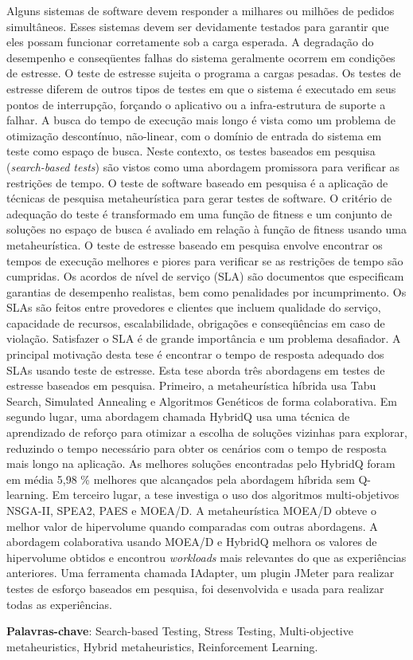 
\begin{resumo} 
 
Alguns sistemas de software devem responder a milhares ou milhões de pedidos simultâneos.
Esses sistemas devem ser devidamente testados para garantir que eles possam funcionar corretamente sob a carga esperada. A degradação do desempenho e conseqüentes falhas do sistema geralmente ocorrem em condições de estresse. O teste de estresse sujeita o programa a cargas pesadas. Os testes de estresse diferem de outros tipos de testes em que o sistema é executado em seus pontos de interrupção, forçando o aplicativo ou a infra-estrutura de suporte a falhar. A busca do tempo de execução mais longo é vista como um problema de otimização descontínuo, não-linear, com o domínio de entrada do sistema em teste como espaço de busca. Neste contexto, os testes baseados em pesquisa (\textit{search-based tests}) são vistos como uma abordagem promissora para verificar as restrições de tempo. O teste de software baseado em pesquisa é a aplicação de técnicas de pesquisa metaheurística para gerar testes de software. O critério de adequação do teste é transformado em uma função de fitness e um conjunto de soluções no espaço de busca é avaliado em relação à função de fitness usando uma metaheurística. O teste de estresse baseado em pesquisa envolve encontrar os tempos de execução melhores e piores para verificar se as restrições de tempo são cumpridas. Os acordos de nível de serviço (SLA) são documentos que especificam garantias de desempenho realistas, bem como penalidades por incumprimento. Os SLAs são feitos entre provedores e clientes que incluem qualidade do serviço, capacidade de recursos, escalabilidade, obrigações e conseqüências em caso de violação. Satisfazer o SLA é de grande importância e um problema desafiador. A principal motivação desta tese é encontrar o tempo de resposta adequado dos SLAs usando teste de estresse. Esta tese aborda três abordagens em testes de estresse baseados em pesquisa. Primeiro, a metaheurística híbrida usa Tabu Search, Simulated Annealing e Algoritmos Genéticos de forma colaborativa. Em segundo lugar, uma abordagem chamada HybridQ usa uma técnica de aprendizado de reforço para otimizar a escolha de soluções vizinhas para explorar, reduzindo o tempo necessário para obter os cenários com o tempo de resposta mais longo na aplicação. As melhores soluções encontradas pelo HybridQ foram em média 5,98 \% melhores que alcançados pela abordagem híbrida sem Q-learning. Em terceiro lugar, a tese investiga o uso dos algoritmos multi-objetivos NSGA-II, SPEA2, PAES e MOEA/D. A metaheurística MOEA/D obteve o melhor valor de hipervolume quando comparadas com outras abordagens. A abordagem colaborativa usando MOEA/D e HybridQ melhora os valores de hipervolume obtidos e encontrou \textit{workloads} mais relevantes do que as experiências anteriores. Uma ferramenta chamada IAdapter, um plugin JMeter para realizar testes de esforço baseados em pesquisa, foi desenvolvida e usada para realizar todas as experiências.

\textbf{Palavras-chave}: Search-based Testing, Stress Testing, Multi-objective metaheuristics, Hybrid metaheuristics, Reinforcement Learning.

\end{resumo}

